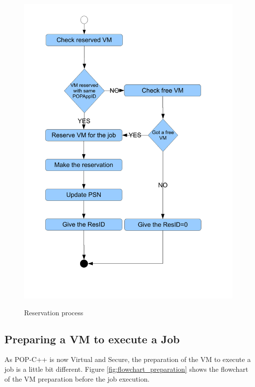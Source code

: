 \begin{figure}[ht]
	\caption{Reservation process}
  	\centering
	\includegraphics[scale=0.5]{./pic/reserve_vm.pdf}
	\label{fig:flowchart_reservation}
\end{figure}

\pagebreak
\subsection{Preparing a VM to execute a Job}
As POP-C++ is now Virtual and Secure, the preparation of the VM to execute a job is a little bit different. Figure \ref{fig:flowchart_preparation} shows the flowchart of the VM preparation before the job execution.

